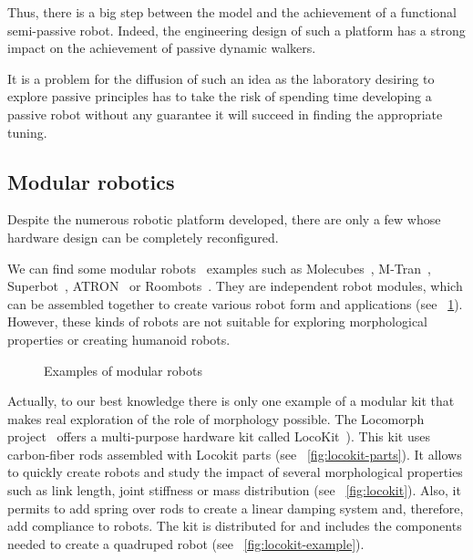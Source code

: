 Thus, there is a big step between the model and the achievement of a functional semi-passive robot. Indeed, the engineering design of such a platform has a strong impact on the achievement of passive dynamic walkers.

It is a problem for the diffusion of such an idea as the laboratory desiring to explore passive principles has to take the risk of spending time developing a passive robot without any guarantee it will succeed in finding the appropriate tuning.


\subsection{Modular robotics} %

Despite the numerous robotic platform developed, there are only a few whose hardware design can be completely reconfigured.

We can find some modular robots~\parencite{murata2007self} examples such as Molecubes~\parencite{zykov2007molecubes}, M-Tran~\parencite{murata2002m}, Superbot~\parencite{salemi2006superbot}, ATRON~\parencite{jorgensen2004modular} or Roombots~\parencite{sproewitz2009roombots}. They are independent robot modules, which can be assembled together to create various robot form and applications (see \figurename~\ref{fig:modular-robots}). However, these kinds of robots are not suitable for exploring morphological properties or creating humanoid robots.

\begin{figure}[tb]
\centering
    \hfil
    \caption{Examples of modular robots}
    \label{fig:modular-robots}
\end{figure}

Actually, to our best knowledge there is only one example of a modular kit that makes real exploration of the role of morphology possible. The Locomorph project~\parencite{locomorph} offers a multi-purpose hardware kit called LocoKit~\parencite{larsen2012locokit}). This kit uses carbon-fiber rods assembled with Locokit parts (see \figurename~\ref{fig:locokit-parts}). It allows to quickly create robots and study the impact of several morphological properties such as link length, joint stiffness or mass distribution (see \figurename~\ref{fig:locokit}). Also, it permits to add spring over rods to create a linear damping system and, therefore, add compliance to robots.
The kit is distributed for  and includes the components needed to create a quadruped robot (see \figurename~\ref{fig:locokit-example}).

